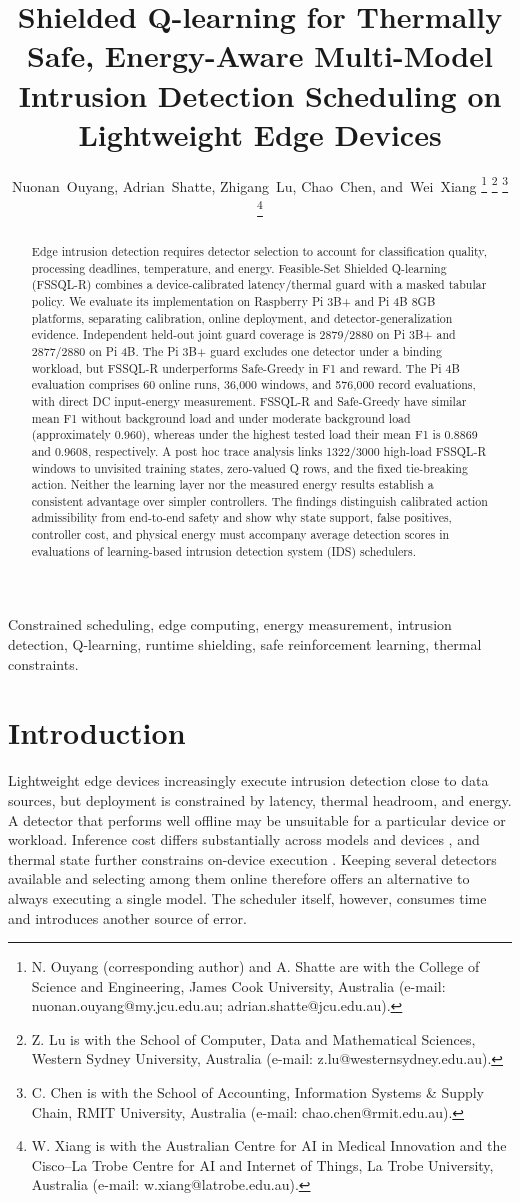 \documentclass[journal]{IEEEtran}
\title{Shielded Q-learning for Thermally Safe, Energy-Aware Multi-Model Intrusion Detection Scheduling on Lightweight Edge Devices}
\author{Nuonan~Ouyang, Adrian~Shatte, Zhigang~Lu, Chao~Chen, and~Wei~Xiang%
\thanks{N. Ouyang (corresponding author) and A. Shatte are with the College of Science and Engineering, James Cook University, Australia (e-mail: nuonan.ouyang@my.jcu.edu.au; adrian.shatte@jcu.edu.au).}%
\thanks{Z. Lu is with the School of Computer, Data and Mathematical Sciences, Western Sydney University, Australia (e-mail: z.lu@westernsydney.edu.au).}%
\thanks{C. Chen is with the School of Accounting, Information Systems \& Supply Chain, RMIT University, Australia (e-mail: chao.chen@rmit.edu.au).}%
\thanks{W. Xiang is with the Australian Centre for AI in Medical Innovation and the Cisco--La Trobe Centre for AI and Internet of Things, La Trobe University, Australia (e-mail: w.xiang@latrobe.edu.au).}%
}
\begin{document}
\maketitle

\begin{abstract}
Edge intrusion detection requires detector selection to account for classification quality, processing deadlines, temperature, and energy. Feasible-Set Shielded Q-learning (FSSQL-R) combines a device-calibrated latency/thermal guard with a masked tabular policy. We evaluate its implementation on Raspberry Pi 3B+ and Pi 4B 8GB platforms, separating calibration, online deployment, and detector-generalization evidence. Independent held-out joint guard coverage is 2879/2880 on Pi 3B+ and 2877/2880 on Pi 4B. The Pi 3B+ guard excludes one detector under a binding workload, but FSSQL-R underperforms Safe-Greedy in F1 and reward. The Pi 4B evaluation comprises 60 online runs, 36,000 windows, and 576,000 record evaluations, with direct DC input-energy measurement. FSSQL-R and Safe-Greedy have similar mean F1 without background load and under moderate background load (approximately 0.960), whereas under the highest tested load their mean F1 is 0.8869 and 0.9608, respectively. A post hoc trace analysis links 1322/3000 high-load FSSQL-R windows to unvisited training states, zero-valued Q rows, and the fixed tie-breaking action. Neither the learning layer nor the measured energy results establish a consistent advantage over simpler controllers. The findings distinguish calibrated action admissibility from end-to-end safety and show why state support, false positives, controller cost, and physical energy must accompany average detection scores in evaluations of learning-based intrusion detection system (IDS) schedulers.
\end{abstract}
\begin{IEEEkeywords}
Constrained scheduling, edge computing, energy measurement, intrusion detection, Q-learning, runtime shielding, safe reinforcement learning, thermal constraints.
\end{IEEEkeywords}

\section{Introduction}
Lightweight edge devices increasingly execute intrusion detection close to data sources, but deployment is constrained by latency, thermal headroom, and energy. A detector that performs well offline may be unsuitable for a particular device or workload. Inference cost differs substantially across models and devices \cite{banbury2021mlperftiny,reddi2019mlperfinference}, and thermal state further constrains on-device execution \cite{tan2024thermalnpu}. Keeping several detectors available and selecting among them online therefore offers an alternative to always executing a single model. The scheduler itself, however, consumes time and introduces another source of error.
\end{document}
